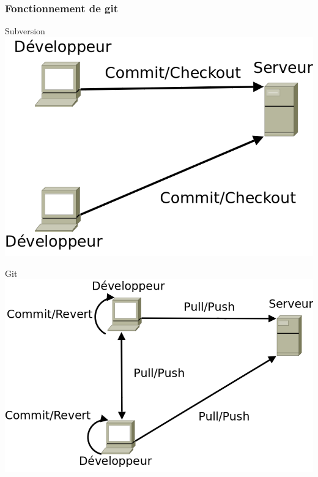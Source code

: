 \begin{frame}\frametitle{Fonctionnement de git}
\begin{centering}
\begin{minipage}[c]{.5\linewidth}
	\begin{beamerboxesrounded}[shadow=true,center]{Subversion}
		\centering
		\includegraphics[width=\linewidth]{../image/svn.png}
	\end{beamerboxesrounded}
\end{minipage}
\vfill
\begin{minipage}[c]{.5\linewidth}
 	\begin{beamerboxesrounded}[shadow=true,center]{Git}
	\includegraphics[width=\linewidth]{../image/gitSimplifie.png}
 	\end{beamerboxesrounded}
\end{minipage}
\vfill
\end{centering}
\end{frame}
